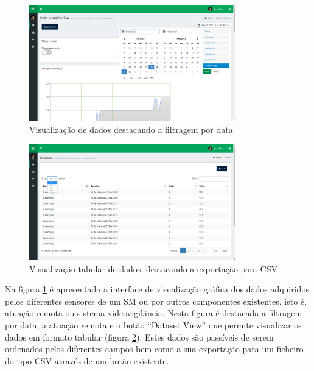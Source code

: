\begin{figure}[h]

		\centering
		\includegraphics[width=0.8\textwidth]{prints-web/dataview.png}
		\caption{Visualização de dados destacando a filtragem por data}
		\label{view_grap_data}

\end{figure}




\begin{figure}[h]
		\centering
		\includegraphics[width=0.8\textwidth]{prints-web/datatab.png}
		\caption{Visualização tabular de dados, destacando a exportação para \acs{CSV}}
		\label{view_tab_data}

\end{figure}

Na figura \ref{view_grap_data} é apresentada a interface de visualização gráfica dos dados adquiridos pelos diferentes sensores de um \acl{SM} ou por outros componentes existentes, isto é, atuação remota ou sistema videovigilância. Nesta figura é destacada a filtragem por data, a atuação remota e o botão ``Dataset View'' que permite visualizar os dados em formato tabular (figura \ref{view_tab_data}). Estes dados são passíveis de serem ordenados pelos diferentes campos bem como a sua exportação para um ficheiro do tipo \ac{CSV} através de um botão existente. 


